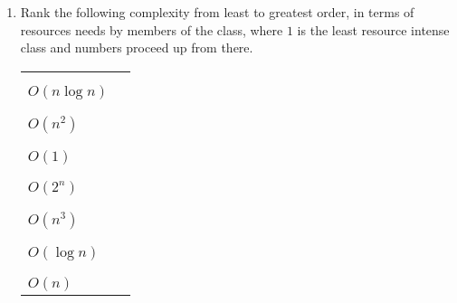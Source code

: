 \documentclass[10pt]{article}
\begin{document}
\begin{enumerate}
\newpage \thispagestyle{empty}

\item Rank the following complexity from least to greatest order, in terms of resources needs by members of the class, where $1$ is the least resource intense class and numbers proceed up from there.

\begin{center}
\begin{tabular}{ll}
       & \\ & \\
$O(n \log n)$ & \underline{\hspace{1.5in}} \\
       & \\ & \\
$O(n^2)$ & \underline{\hspace{1.5in}} \\
       & \\ & \\
$O(1)$ & \underline{\hspace{1.5in}} \\
       & \\ & \\
$O(2^n)$ & \underline{\hspace{1.5in}} \\
       & \\ & \\
$O(n^3)$ & \underline{\hspace{1.5in}} \\
       & \\ & \\
$O(\log n)$ & \underline{\hspace{1.5in}} \\
       & \\ & \\
$O(n)$ & \underline{\hspace{1.5in}}
\end{tabular}
\end{center}


\end{enumerate}
\end{document}
